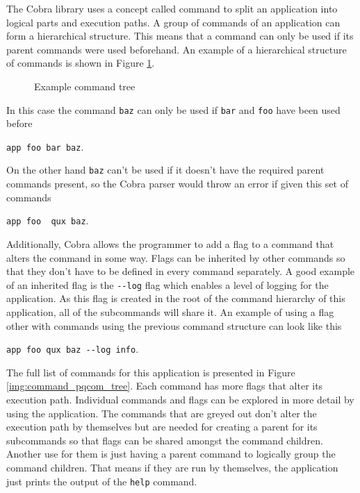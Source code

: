 The Cobra library uses a concept called command to split an application into logical parts and execution paths. A group of commands of an application can form a hierarchical structure. This means that a command can only be used if its parent commands were used beforehand. An example of a hierarchical structure of commands is shown in Figure \ref{img:example_tree}.

\begin{figure}[h!]
  \begin{center}
    \begin{minipage}[t]{0.2\linewidth}
    \end{minipage}
  \end{center}
  \caption{Example command tree}
  \label{img:example_tree}
\end{figure}

\noindent In this case the command \texttt{baz} can only be used if \texttt{bar} and \texttt{foo} have been used before
\begin{center}
  \texttt{app foo bar baz}.
\end{center}
On the other hand \texttt{baz} can't be used if it doesn't have the required parent commands present, so the Cobra parser would throw an error if given this set of commands
\begin{center}
  \texttt{app foo {\color{red} qux} baz}.
\end{center}
Additionally, Cobra allows the programmer to add a flag to a command that alters the command in some way. Flags can be inherited by other commands so that they don't have to be defined in every command separately. A good example of an inherited flag is the \texttt{-\--log} flag which enables a level of logging for the application. As this flag is created in the root of the command hierarchy of this application, all of the subcommands will share it. An example of using a flag other with commands using the previous command structure can look like this
\begin{center}
  \texttt{app foo qux baz -\--log info}.
\end{center}

The full list of commands for this application is presented in Figure \ref{img:command_pqcom_tree}. Each command has more flags that alter its execution path. Individual commands and flags can be explored in more detail by using the application. The commands that are greyed out don't alter the execution path by themselves but are needed for creating a parent for its subcommands so that flags can be shared amongst the command children. Another use for them is just having a parent command to logically group the command children. That means if they are run by themselves, the application just prints the output of the \texttt{help} command.

